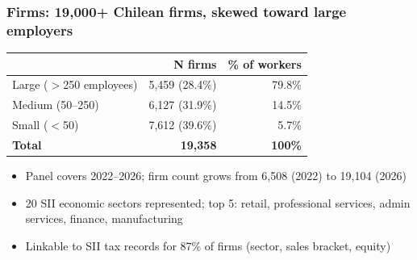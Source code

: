 \documentclass[aspectratio=169, 11pt]{beamer}
\begin{document}
\begin{frame}
\frametitle{Firms: 19,000+ Chilean firms, skewed toward large employers}

\begin{center}
\small
\begin{tabular}{@{}lrr@{}}
\toprule
& \textbf{N firms} & \textbf{\% of workers} \\
\midrule
Large ($>$250 employees) & 5,459 \;\;(28.4\%) & 79.8\% \\
Medium (50--250) & 6,127 \;\;(31.9\%) & 14.5\% \\
Small ($<$50) & 7,612 \;\;(39.6\%) & 5.7\% \\
\midrule
\textbf{Total} & \textbf{19,358} & \textbf{100\%} \\
\bottomrule
\end{tabular}
\end{center}
\vspace{0.3cm}
\begin{itemize}
    \item Panel covers 2022--2026; firm count grows from 6,508 (2022) to 19,104 (2026)
    \item 20 SII economic sectors represented; top 5: retail, professional services, admin services, finance, manufacturing
    \item Linkable to SII tax records for 87\% of firms (sector, sales bracket, equity)
\end{itemize}


\end{frame}
\end{document}
